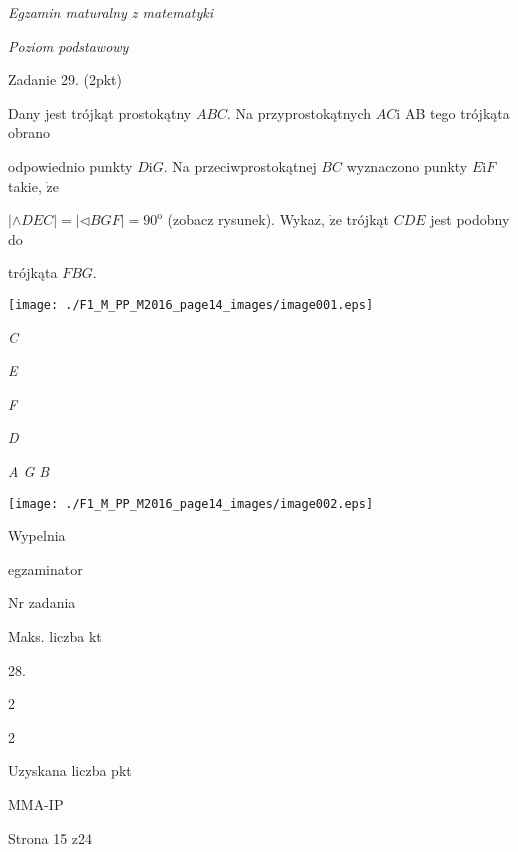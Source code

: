 \documentclass[a4paper,12pt]{article}
\begin{document}
{\it Egzamin maturalny z matematyki}

{\it Poziom podstawowy}

Zadanie 29. (2pkt)

Dany jest trójkąt prostokątny $ABC$. Na przyprostokątnych $AC\mathrm{i}$ AB tego trójkąta obrano

odpowiednio punkty $D\mathrm{i}G$. Na przeciwprostokątnej $BC$ wyznaczono punkty $E\mathrm{i}F$ takie, $\dot{\mathrm{z}}\mathrm{e}$

$|\wedge DEC|=|\triangleleft BGF|=90^{\mathrm{o}}$ (zobacz rysunek). Wykaz, $\dot{\mathrm{z}}\mathrm{e}$ trójkąt $CDE$ jest podobny do

trójkąta $FBG.$
\begin{center}
\texttt{[image: ./F1\_M\_PP\_M2016\_page14\_images/image001.eps]}
\end{center}
{\it C}

{\it E}

{\it F}

{\it D}

{\it A  G B}
\begin{center}
\texttt{[image: ./F1\_M\_PP\_M2016\_page14\_images/image002.eps]}
\end{center}
Wypelnia

egzaminator

Nr zadania

Maks. liczba kt

28.

2

2

Uzyskana liczba pkt

MMA-IP

Strona 15 z24
\end{document}
